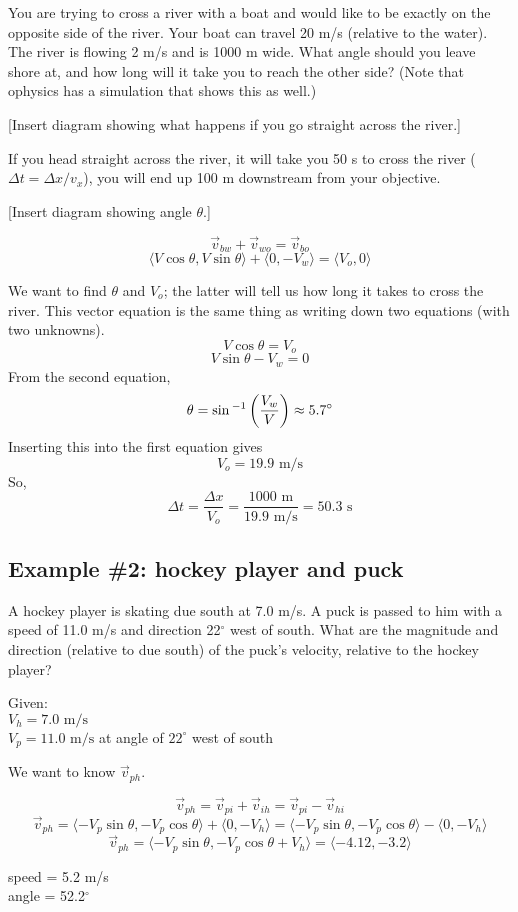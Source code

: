 You are trying to cross a river with a boat and would like to be exactly on the opposite side of the river. Your boat can travel 20 m/s (relative to the water). The river is flowing 2 m/s and is 1000 m wide. What angle should you leave shore at, and how long will it take you to reach the other side? (Note that ophysics has a simulation that shows this as well.)

[Insert diagram showing what happens if you go straight across the river.]
\vspace{4cm}

If you head straight across the river, it will take you 50 s to cross the river ($\Delta{t}=\Delta{x}/v_x$), you will end up 100 m downstream from your objective.

[Insert diagram showing angle $\theta$.]
\vspace{4cm}

$$\vec{v}_{bw}+\vec{v}_{wo}=\vec{v}_{bo}$$
$$\langle{V\cos\theta,V\sin\theta}\rangle+\langle{0,-V_w}\rangle=\langle{V_o,0}\rangle$$

We want to find $\theta$ and $V_o$; the latter will tell us how long it takes to cross the river. This vector equation is the same thing as writing down two equations (with two unknowns).
$$V\cos\theta=V_o$$
$$V\sin\theta-V_w=0$$
From the second equation,
$$\theta=\sin\displaystyle^{-1}\left(\frac{V_w}{V}\right)\approx 5.7^\circ$$
Inserting this into the first equation gives
$$V_o=19.9\mbox{ m/s}$$
So,
$$\Delta{t}=\frac{\Delta{x}}{V_o}=\frac{1000\mbox{ m}}{19.9 \mbox{ m/s}}=50.3\mbox{ s}$$

\subsection{Example \#2: hockey player and puck}
A hockey player is skating due south at 7.0 m/s. A puck is passed to him with a speed of 11.0 m/s and direction 22$^\circ$ west of south. What are the magnitude and direction (relative to due south) of the puck's velocity, relative to the hockey player?

Given:\\
$V_h=7.0\mbox{ m/s}$\\
$V_p=11.0\mbox{ m/s}$ at angle of $22^\circ$ west of south

We want to know $\vec{v}_{ph}$.

$$\vec{v}_{ph}=\vec{v}_{pi}+\vec{v}_{ih}=\vec{v}_{pi}-\vec{v}_{hi}$$
$$\vec{v}_{ph}=\langle{-V_p\sin\theta,-V_p\cos\theta}\rangle+\langle{0,-V_h}\rangle=\langle{-V_p\sin\theta,-V_p\cos\theta}\rangle-\langle{0,-V_h}\rangle$$
$$\vec{v}_{ph}=\langle{-V_p\sin\theta,-V_p\cos\theta+V_h}\rangle=\langle{-4.12,-3.2}\rangle$$

speed = 5.2 m/s\\
angle = 52.2$^\circ$ 

\clearpage
